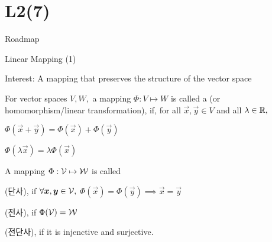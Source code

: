 \documentclass[handout,fleqn,aspectratio=169]{beamer}
\begin{document}
\section{L2(7)}
\begin{frame}{Roadmap}

\plitemsep 0.1in

\bce[(1)] 
\item {}

\item {}

\item {}

\ece
\end{frame}


\begin{frame}{Linear Mapping (1)}

\plitemsep 0.1in

\bci 
\item Interest: A mapping that preserves the structure of the vector space
\item {} For vector spaces $V,W,$ a mapping $\Phi: V \mapsto W$ is called a  (or homomorphism/linear transformation), if, for all $\vec{x}, \vec{y} \in V$ and all $\lambda \in {\mathbb R},$
\bci
\item $\Phi(\vec{x} + \vec{y}) = \Phi(\vec{x}) + \Phi(\vec{y})$
\item $\Phi(\lambda \vec{x}) = \lambda \Phi(\vec{x})$
\eci

\item {} A mapping $\Phi: \mathcal V \mapsto \mathcal W$ is called
\bci
\item {} (단사), if $\forall \bm{x},\bm{y} \in \mathcal V,$ $\Phi(\vec{x}) = \Phi(\vec{y}) \implies \vec{x} = \vec{y}$

\item {} (전사), if $\Phi(\mathcal V) = \mathcal W$

\item {} (전단사), if it is injenctive and surjective. 
\eci

\eci

\end{frame}
\end{document}
